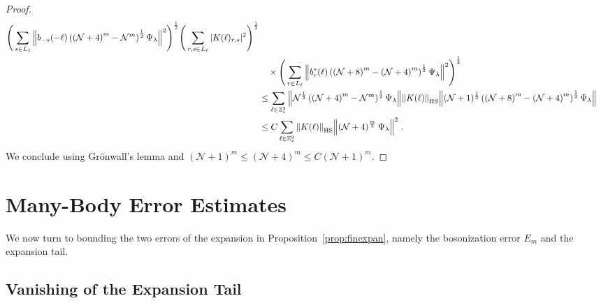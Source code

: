 \documentclass[12pt,a4paper]{article}
\numberwithin{equation}{section}
\newcommand{\cN}{\mathcal{N}}
\newcommand{\1}{\mathbb{I}}
\newcommand{\HS}{\mathrm{HS}}
\newcommand{\NN}{\mathcal{N}}
\newcommand{\half}{\frac{1}{2}}
\theoremstyle{plain}
\theoremstyle{definition}
\theoremstyle{remark}
\theoremstyle{plain}
\theoremstyle{definition}
\theoremstyle{remark}
\begin{document}
\begin{proof}
\begin{align}
		\Bigg( \sum_{s\in L_\ell} \norm{ b_{-s}(-\ell) \left( \left(\NN+4\right)^m - \NN^m \right)^\half \Psi_\lambda}^2 \Bigg)^{\half}
		\Bigg( \sum_{r,s\in L_\ell} |K(\ell)_{r,s}|^2 \Bigg)^{\half} \nonumber\\
		&\quad \times \Bigg( \sum_{r\in L_\ell} \norm {b^*_{r}(\ell) \left( \left(\NN+8\right)^m - \left(\NN+4\right)^m \right)^\half \Psi_\lambda}^2 \Bigg)^{\half} \nonumber\\
	&\leq \sum_{\ell\in \mathbb{Z}^3_*}
		\norm{ \NN^\half \left( \left(\NN+4\right)^m - \NN^m \right)^\half \Psi_\lambda}
		\norm{K(\ell)}_{\HS}
		\norm{ (\NN+1)^\half \left( \left(\NN+8\right)^m - \left(\NN+4\right)^m \right)^\half \Psi_\lambda } \nonumber\\
	&\leq C \sum_{\ell\in \mathbb{Z}^3_*}
		\norm{K(\ell)}_{\HS}
		\norm{ \left(\NN+4\right)^\frac{m}{2} \Psi_\lambda}^2 \;.
\end{align}
We conclude using Gr\"onwall's lemma and $ (\cN+1)^m \le (\cN+4)^m \le C (\cN+1)^m $.
\end{proof}

\section{Many-Body Error Estimates}
\label{subsec:manybody_estimates}

We now turn to bounding the two errors of the expansion in Proposition~\ref{prop:finexpan}, namely the bosonization error $ E_m $ and the expansion tail.


\subsection{Vanishing of the Expansion Tail}
\label{subsec:tailestimate}
\end{document}

